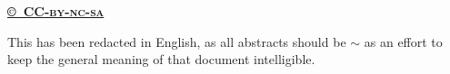 
\href{https://creativecommons.org/licenses/by-nc-sa/3.0/}{\textbf{©~CC\textsc{-by-nc-sa}}}\par This has been redacted in English, as all abstracts should be $\sim$ as an effort to keep the general meaning of that document intelligible.